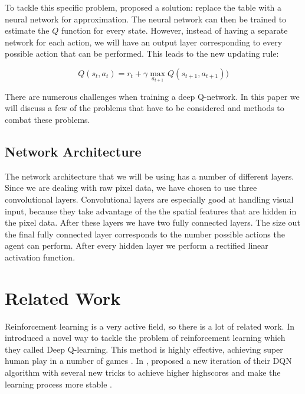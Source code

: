 \documentclass{article}
\begin{document}
To tackle this specific problem, \citeauthor{mnih2013playing} proposed a solution: replace the table with a neural network for approximation. The neural network can then be trained to estimate the $Q$ function for every state. However, instead of having a separate network for each action, we will have an output layer corresponding to every possible action that can be performed. This leads to the new updating rule:

\[
    Q(s_t,a_t) = r_t + \gamma \max_{a_{t+1}} Q(s_{t+1},a_{t+1}))
\]


There are numerous challenges when training a deep Q-network. In this paper we will discuss a few of the problems that have to be considered and methods to combat these problems.

\subsection{Network Architecture}

The network architecture that we will be using has a number of different layers. Since we are dealing with raw pixel data, we have chosen to use three convolutional layers. Convolutional layers are especially good at handling visual input, because they take advantage of the the spatial features that are hidden in the pixel data. After these layers we have two fully connected layers. The size out the final fully connected layer corresponds to the number possible actions the agent can perform. After every hidden layer we perform a rectified linear activation function.



\section{Related Work}

Reinforcement learning is a very active field, so there is a lot of related work. In \citeyear{mnih2013playing} \citeauthor{mnih2013playing} introduced a novel way to tackle the problem of reinforcement learning which they called Deep Q-learning. This method is highly effective, achieving super human play in a number of games \cite{mnih2013learning}. In \citeyear{mnih2015human}, \citeauthor{mnih2013playing} proposed a new iteration of their DQN algorithm with several new tricks to achieve higher highscores and make the learning process more stable \cite{mnih2015human}.
\end{document}
